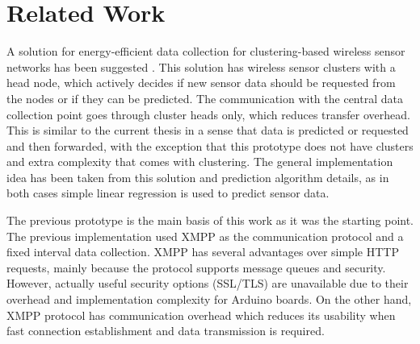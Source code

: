 

\chapter{Related Work} %

A solution for energy-efficient data collection for clustering-based wireless sensor networks has been suggested \cite{cluster_wsn_paper}. This solution has wireless sensor clusters with a head node, which actively decides if new sensor data should be requested from the nodes or if they can be predicted. The communication with the central data collection point goes through cluster heads only, which reduces transfer overhead. This is similar to the current thesis in a sense that data is predicted or requested and then forwarded, with the exception that this prototype does not have clusters and extra complexity that comes with clustering. 
The general implementation idea has been taken from this solution and prediction algorithm details, as in both cases simple linear regression is used to predict sensor data.

The previous prototype \cite{prev_thesis} is the main basis of this work as it was the starting point. The previous implementation used XMPP as the communication protocol and a fixed interval data collection. XMPP has several advantages over simple HTTP requests, mainly because the protocol supports message queues and security. However, actually useful security options (SSL/TLS) are unavailable due to their overhead and implementation complexity for Arduino boards. On the other hand, XMPP protocol has communication overhead which reduces its usability when fast connection establishment and data transmission is required.










 






